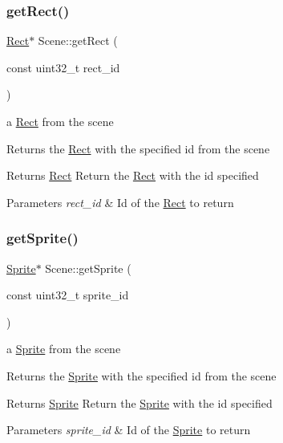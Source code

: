 \subsubsection{\texorpdfstring{get\+Rect()}{getRect()}}
{\footnotesize\ttfamily \hyperlink{class_rect}{Rect}$\ast$ Scene\+::get\+Rect (\begin{DoxyParamCaption}\item[{const uint32\+\_\+t}]{rect\+\_\+id }\end{DoxyParamCaption})}

a \hyperlink{class_rect}{Rect} from the scene

Returns the \hyperlink{class_rect}{Rect} with the specified id from the scene

\begin{DoxyReturn}{Returns}
\hyperlink{class_rect}{Rect} Return the \hyperlink{class_rect}{Rect} with the id specified 
\end{DoxyReturn}

\begin{DoxyParams}{Parameters}
{\em rect\+\_\+id} & Id of the \hyperlink{class_rect}{Rect} to return \\
\hline
\end{DoxyParams}
\mbox{\label{class_scene_a45418063b55b68e440cac7fab52e3c51}} 
\subsubsection{\texorpdfstring{get\+Sprite()}{getSprite()}}
{\footnotesize\ttfamily \hyperlink{class_sprite}{Sprite}$\ast$ Scene\+::get\+Sprite (\begin{DoxyParamCaption}\item[{const uint32\+\_\+t}]{sprite\+\_\+id }\end{DoxyParamCaption})}

a \hyperlink{class_sprite}{Sprite} from the scene

Returns the \hyperlink{class_sprite}{Sprite} with the specified id from the scene

\begin{DoxyReturn}{Returns}
\hyperlink{class_sprite}{Sprite} Return the \hyperlink{class_sprite}{Sprite} with the id specified 
\end{DoxyReturn}

\begin{DoxyParams}{Parameters}
{\em sprite\+\_\+id} & Id of the \hyperlink{class_sprite}{Sprite} to return \\
\hline
\end{DoxyParams}
\mbox{\label{class_scene_a1c7233bcc955b7b71156b31205ec2360}} 
